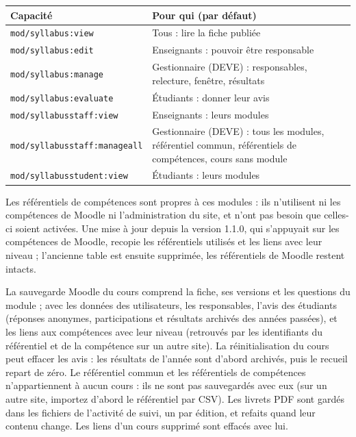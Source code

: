 \documentclass[11pt,a4paper]{article}
\begin{document}
\begin{center}
\small
\begin{tabularx}{\linewidth}{@{}l X@{}}
\toprule
\textbf{Capacité} & \textbf{Pour qui (par défaut)} \\
\midrule
\texttt{mod/syllabus:view} & Tous : lire la fiche publiée \\
\texttt{mod/syllabus:edit} & Enseignants : pouvoir être responsable \\
\texttt{mod/syllabus:manage} & Gestionnaire (DEVE) : responsables, relecture, fenêtre,
résultats \\
\texttt{mod/syllabus:evaluate} & Étudiants : donner leur avis \\
\texttt{mod/syllabusstaff:view} & Enseignants : leurs modules \\
\texttt{mod/syllabusstaff:manageall} & Gestionnaire (DEVE) : tous les modules, référentiel
commun, référentiels de compétences, cours sans module \\
\texttt{mod/syllabusstudent:view} & Étudiants : leurs modules \\
\bottomrule
\end{tabularx}
\end{center}

Les référentiels de compétences sont propres à ces modules : ils n'utilisent ni les
compétences de Moodle ni l'administration du site, et n'ont pas besoin que celles-ci soient
activées. Une mise à jour depuis la version 1.1.0, qui s'appuyait sur les compétences de
Moodle, recopie les référentiels utilisés et les liens avec leur niveau ; l'ancienne table est
ensuite supprimée, les référentiels de Moodle restent intacts.

La sauvegarde Moodle du cours comprend la fiche, ses versions et les questions du module ;
avec les données des utilisateurs, les responsables, l'avis des étudiants (réponses anonymes,
participations et résultats archivés des années passées), et les liens aux compétences avec leur niveau (retrouvés par les identifiants
du référentiel et de la compétence sur un autre site). La réinitialisation du cours peut
effacer les avis : les résultats de l'année sont d'abord archivés, puis le recueil repart de
zéro. Le référentiel commun et
les référentiels de compétences n'appartiennent à aucun cours : ils ne sont pas sauvegardés
avec eux (sur un autre site, importez d'abord le référentiel par CSV). Les livrets PDF sont
gardés dans les fichiers de l'activité de suivi, un par édition, et refaits quand leur contenu
change. Les liens d'un cours
supprimé sont effacés avec lui.
\end{document}
